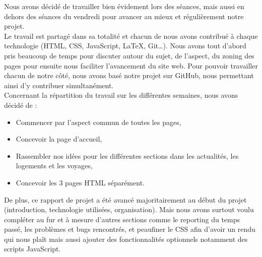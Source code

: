 Nous avons décidé de travailler bien évidement lors des séances, mais aussi en dehors des séances du vendredi pour avancer au mieux et régulièrement notre projet.\\

Le travail est partagé dans sa totalité et chacun de nous avons contribué à chaque technologie (HTML, CSS, JavaScript, LaTeX, Git\ldots).
Nous avons tout d'abord pris beaucoup de temps pour discuter autour du sujet, de l'aspect, du zoning des pages pour ensuite nous faciliter l'avancement du site web.
Pour pouvoir travailler chacun de notre côté, nous avons basé notre projet sur GitHub, nous permettant ainsi d'y contribuer simultanément. \\

Concernant la répartition du travail sur les différentes semaines, nous avons décidé de : 
\begin{itemize}
    \item Commencer par l'aspect commun de toutes les pages, 
    \item Concevoir la page d'accueil, 
    \item Rassembler nos idées pour les différentes sections dans les actualités, les logements et les voyages,
    \item Concevoir les 3 pages HTML séparément.
\end{itemize}
De plus, ce rapport de projet a été avancé majoritairement au début du projet (introduction, technologie utilisées, organisation).
Mais nous avons surtout voulu compléter au fur et à mesure d'autres sections comme le reporting du temps passé, les problèmes et bugs rencontrés, et peaufiner le CSS afin d'avoir un rendu qui nous plaît mais aussi ajouter des fonctionnalités optionnels notamment des scripts JavaScript. 

